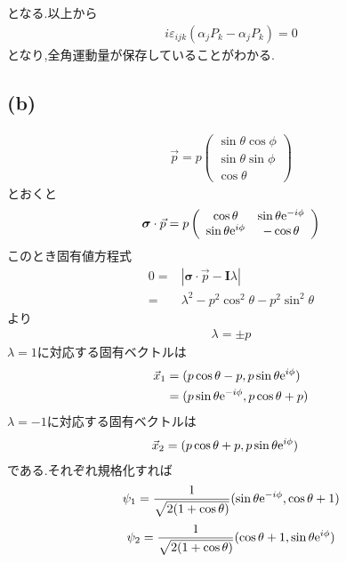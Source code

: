 \documentclass[uplatex,a4j,11pt,dvipdfmx]{jsarticle}
\begin{document}
となる.以上から
\begin{align}
  [H_{\rm Dirac},J_i+S_i]i\varepsilon_{ijk}(\alpha_jP_k-\alpha_jP_k)=0
\end{align}
となり,全角運動量が保存していることがわかる.
\subsection*{(b)}
\begin{align*}
  \vec{p}=p\left(
    \begin{array}{c}
      \sin\theta\cos\phi\\
      \sin\theta\sin\phi\\
      \cos\theta
    \end{array}
  \right)
\end{align*}
とおくと
\begin{align*}
  {\bm \sigma}\cdot\vec{p}=p\left(
    \begin{array}{cc}
      \cos\theta&\sin\theta{\rm e}^{-i\phi}\\
      \sin\theta{\rm e}^{i\phi}&-\cos\theta\\
    \end{array}
  \right)
\end{align*}
このとき固有値方程式
\begin{align*}
  0=&|{\bm \sigma}\cdot\vec{p}-{\bm I}\lambda|\\
  =&\lambda^2-p^2\cos^2\theta-p^2\sin^2\theta
\end{align*}
より
\begin{align}
  \lambda=\pm p
\end{align}
$\lambda=1$に対応する固有ベクトルは
\begin{align*}
  \begin{split}
    \vec{x}_1&=(p\cos\theta-p,p\sin\theta{\rm e}^{i\phi})\\
    &=(p\sin\theta{\rm e}^{-i\phi},p\cos\theta+p)
  \end{split}
\end{align*}
$\lambda=-1$に対応する固有ベクトルは
\begin{align*}
  \vec{x}_2&=(p\cos\theta+p,p\sin\theta{\rm e}^{i\phi})
\end{align*}
である.それぞれ規格化すれば
\begin{align}
  \psi_1=\frac{1}{\sqrt{2(1+\cos\theta)}}(\sin\theta{\rm e}^{-i\phi},\cos\theta+1)
\end{align}
\begin{align}
  \psi_2=\frac{1}{\sqrt{2(1+\cos\theta)}}(\cos\theta+1,\sin\theta{\rm e}^{i\phi})
\end{align}
\end{document}
